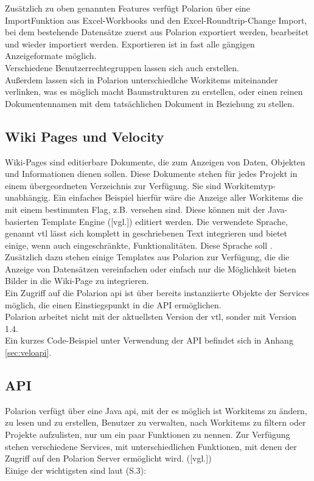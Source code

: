 Zusätzlich zu oben genannten Features verfügt Polarion über eine Import\-Funktion aus Excel-Workbooks und den Excel-Roundtrip-Change Import, bei dem bestehende Datensätze zuerst aus Polarion exportiert werden, bearbeitet und wieder importiert werden. Exportieren ist in fast alle gängigen Anzeigeformate möglich.\\
Verschiedene Benutzerrechtegruppen lassen sich auch erstellen.\\
Außerdem lassen sich in Polarion unterschiedlche Workitems miteinander verlinken, was es möglich macht Baumstrukturen zu erstellen, oder einen reinen Dokumentennamen mit dem tatsächlichen Dokument in Beziehung zu stellen.
\\
\subsection{Wiki Pages und Velocity}
\label{sub:veloc}
Wiki-Pages sind editierbare Dokumente, die zum Anzeigen von Daten, Objekten und Informationen dienen sollen. Diese Dokumente stehen für jedes Projekt in einem übergeordneten Verzeichnis zur Verfügung. Sie sind Workitemtyp-unabhängig. Ein einfaches Beispiel hierfür wäre die Anzeige aller Workitems die mit einem bestimmten Flag, z.B.  versehen sind. Diese  können mit der Java-basierten Template Engine  (\cite{6}[vgl.]) editiert werden. Die verwendete Sprache, genannt \ac{vtl} lässt sich komplett in geschriebenen Text integrieren und bietet einige, wenn auch eingeschränkte, Funktionalitäten.
Diese Sprache soll  \cite{6}. \\
Zusätzlich dazu stehen einige Templates aus Polarion zur Verfügung, die die Anzeige von Datensätzen vereinfachen oder einfach nur die Möglichkeit bieten Bilder in die Wiki-Page zu integrieren.
\\
Ein Zugriff auf die Polarion \ac{api} ist über bereits in­s­tan­zi­ie­rte Objekte der Services möglich, die einen Einstiegspunkt in die API ermöglichen.\\
Polarion arbeitet nicht mit der aktuellsten Version der \ac{vtl}, sonder mit Version 1.4. \cite[vgl. S.8]{18}\\
Ein kurzes Code-Beispiel unter Verwendung der API befindet sich in Anhang \ref{sec:veloapi}.
 
\subsection{API}
\label{sub:api}
Polarion verfügt über eine Java \ac{api}, mit der es möglich ist Workitems zu ändern, zu lesen und zu erstellen, Benutzer zu verwalten, nach Workitems zu filtern oder Projekte aufzulisten, nur um ein paar Funktionen zu nennen. Zur Verfügung stehen verschiedene Services, mit unterschiedlichen Funktionen, mit denen der Zugriff auf den Polarion Server ermöglicht wird. (\cite{17}[vgl.]) \\
Einige der wichtigsten sind laut \cite{17}(S.3):
